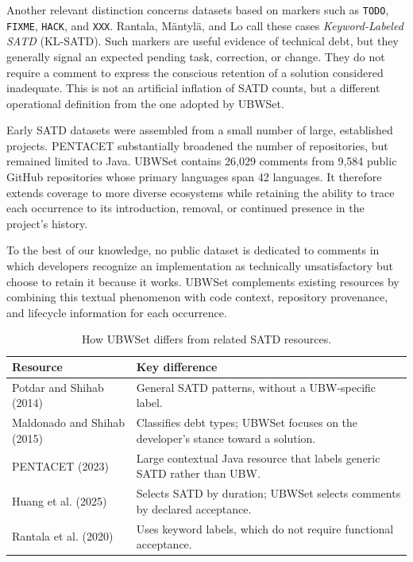 \documentclass[10pt,conference]{IEEEtran}
\begin{document}
Another relevant distinction concerns datasets based on markers such as
\texttt{TODO}, \texttt{FIXME}, \texttt{HACK}, and \texttt{XXX}. Rantala,
M{\"a}ntyl{\"a}, and Lo \cite{rantala2020klsatd} call these cases
\emph{Keyword-Labeled SATD} (KL-SATD). Such markers are useful evidence of
technical debt, but they generally signal an expected pending task, correction, or
change. They do not require a comment to express the conscious retention of a
solution considered inadequate. This is not an artificial inflation of SATD counts,
but a different operational definition from the one adopted by UBWSet.

Early SATD datasets were assembled from a small number of large, established
projects. PENTACET substantially broadened the number of repositories, but
remained limited to Java. UBWSet contains 26,029 comments from 9,584 public
GitHub repositories whose primary languages span 42 languages. It therefore
extends coverage to more diverse ecosystems while retaining the ability to trace
each occurrence to its introduction, removal, or continued presence in the
project's history.

To the best of our knowledge, no public dataset is dedicated to comments in which
developers recognize an implementation as technically unsatisfactory but choose to
retain it because it works. UBWSet complements existing resources by combining
this textual phenomenon with code context, repository provenance, and lifecycle
information for each occurrence.

\begin{table}[H]
\centering
\caption{How UBWSet differs from related SATD resources.}
\label{tab:related-datasets}
\footnotesize
\setlength{\tabcolsep}{3pt}
\renewcommand{\arraystretch}{1.12}
\begin{tabular}{>{\raggedright\arraybackslash}p{1.85cm} >{\raggedright\arraybackslash}p{5.45cm}}
\toprule
\textbf{Resource} & \textbf{Key difference} \\
\midrule
Potdar and Shihab (2014) & General SATD patterns, without a UBW-specific label. \\

Maldonado and Shihab (2015) & Classifies debt types; UBWSet focuses on the developer's stance toward a solution. \\

PENTACET (2023) & Large contextual Java resource that labels generic SATD rather than UBW. \\

Huang et al. (2025) & Selects SATD by duration; UBWSet selects comments by declared acceptance. \\

Rantala et al. (2020) & Uses keyword labels, which do not require functional acceptance. \\
\bottomrule
\end{tabular}
\end{table}
\end{document}
